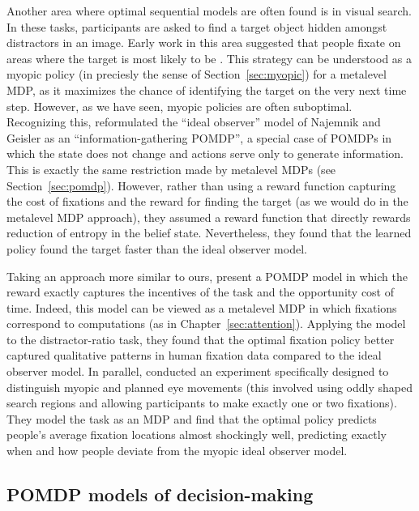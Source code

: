 Another area where optimal sequential models are often found is in visual search. In these tasks, participants are asked to find a target object hidden amongst distractors in an image. Early work in this area suggested that people fixate on areas where the target is most likely to be \citep{najemnik2005optimal}. This strategy can be understood as a myopic policy (in preciesly the sense of Section~\ref{sec:myopic}) for a metalevel MDP, as it maximizes the chance of identifying the target on the very next time step. However, as we have seen, myopic policies are often suboptimal. Recognizing this, \citet{butko2008ipomdp} reformulated the ``ideal observer'' model of Najemnik and Geisler as an ``information-gathering POMDP'', a special case of POMDPs in which the state does not change and actions serve only to generate information. This is exactly the same restriction made by metalevel MDPs (see Section~\ref{sec:pomdp}). However, rather than using a reward function capturing the cost of fixations and the reward for finding the target (as we would do in the metalevel MDP approach), they assumed a reward function that directly rewards reduction of entropy in the belief state. Nevertheless, they found that the learned policy found the target faster than the ideal observer model.

Taking an approach more similar to ours, \citet{acharya2017human} present a POMDP model in which the reward exactly captures the incentives of the task and the opportunity cost of time. Indeed, this model can be viewed as a metalevel MDP in which fixations correspond to computations (as in Chapter~\ref{sec:attention}). Applying the model to the distractor-ratio task, they found that the optimal fixation policy better captured qualitative patterns in human fixation data compared to the ideal observer model. In parallel, \citet{hoppe2019multistep} conducted an experiment specifically designed to distinguish myopic and planned eye movements (this involved using oddly shaped search regions and allowing participants to make exactly one or two fixations). They model the task as an MDP and find that the optimal policy predicts people's average fixation locations almost shockingly well, predicting exactly when and how people deviate from the myopic ideal observer model.

\subsection{POMDP models of decision-making}\label{sec:alternative-pomdp}

